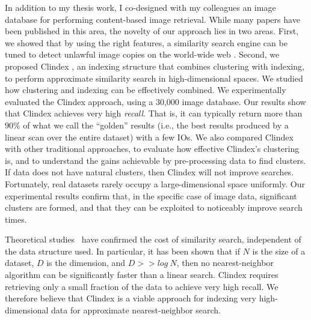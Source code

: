 In addition to my thesis work,
I co-designed with my colleagues an image database
for performing content-based
image retrieval. While many papers have been published in this
area, the novelty of our approach lies in two areas. First, we showed that
by using the right features, a similarity search engine
can be tuned to detect unlawful image copies on the world-wide
web \cite{Clw99,Cwl98}. Second, we proposed Clindex \cite{Lch99}, 
an indexing structure that
combines clustering with indexing, to perform approximate similarity
search in high-dimensional spaces. 
We studied how clustering and indexing can be effectively combined.
We experimentally evaluated the Clindex approach,
using a 30,000 image database.
Our results show that Clindex
achieves very high {\em recall}.  That is, it can typically return
more than $90\%$ of what we call the ``golden'' results (i.e., the
best results produced by a linear scan over the entire dataset) with
a few IOs.  We also compared Clindex with other traditional approaches,
to evaluate how effective Clindex's clustering is,
and to understand the gains achievable by
pre-processing data to find clusters.
If data does not have natural clusters, then Clindex will
not improve searches. Fortunately, real datasets rarely occupy a
large-dimensional space uniformly. Our experimental results confirm that,
in the specific case of image data,
significant clusters are formed, and that they can be
exploited to noticeably improve search times.

Theoretical studies~\cite{AM94,IM98,Jk97} have confirmed the cost of
similarity search, independent of the data structure used.  In particular,
it has been shown that if $N$ is the size of a dataset, $D$ is the
dimension, and $D >> log~N$, then no nearest-neighbor algorithm can
be significantly faster than a linear search.
Clindex requires retrieving only a small fraction of the data to
achieve very high recall. We therefore believe that Clindex is a viable
approach for indexing very high-dimensional data for
approximate nearest-neighbor search.


